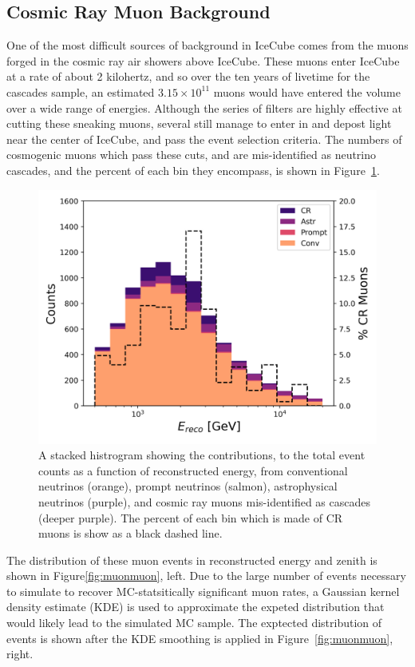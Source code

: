\documentclass[main.tex]{subfiles}
\begin{document}
\subsection{Cosmic Ray Muon Background}

One of the most difficult sources of background in IceCube comes from the muons forged in the cosmic ray air showers above IceCube. 
These muons enter IceCube at a rate of about 2 kilohertz, and so over the ten years of livetime for the cascades sample, an estimated $3.15\times 10^{11}$ muons would have entered the volume over a wide range of energies. 
Although the series of filters are highly effective at cutting these sneaking muons, several still manage to enter in and depost light near the center of IceCube, and pass the event selection criteria. 
The numbers of cosmogenic muons which pass these cuts, and are mis-identified as neutrino cascades, and the percent of each bin they encompass, is shown in Figure~\ref{fig:muonperc}.

\begin{figure}
    \centering
    \includegraphics[width=0.8\linewidth]{figures/expectation_stacked.png}
    \caption{A stacked histrogram showing the contributions,  to the total event counts as a function of reconstructed energy, from conventional neutrinos (orange), prompt neutrinos (salmon), astrophysical neutrinos (purple), and cosmic ray muons mis-identified as cascades (deeper purple). The percent of each bin which is made of CR muons is show as a black dashed line.}\label{fig:muonperc}
\end{figure}

The distribution of these muon events in reconstructed energy and zenith is shown in Figure\ref{fig:muonmuon}, left.
Due to the large number of events necessary to simulate to recover MC-statsitically significant muon rates, a Gaussian kernel density estimate (KDE) is used to approximate the expeted distribution that would likely lead to the simulated MC sample. 
The exptected distribution of events is shown after the KDE smoothing is applied in Figure~\ref{fig:muonmuon}, right. 
\end{document}
